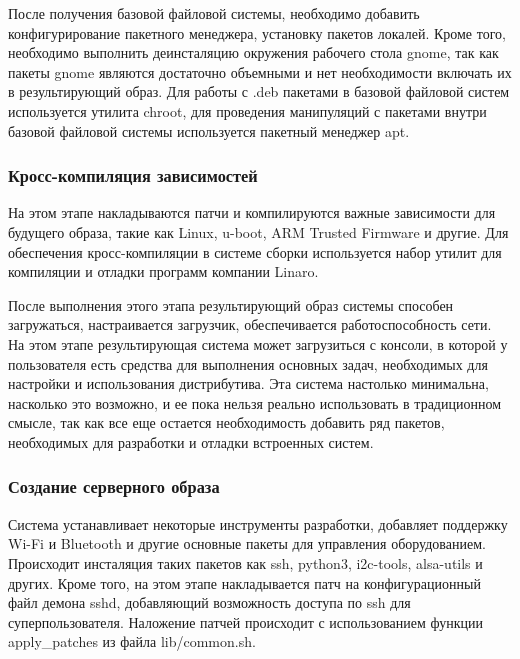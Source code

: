 После получения базовой файловой системы, необходимо добавить конфигурирование пакетного менеджера, установку пакетов локалей.
Кроме того, необходимо выполнить деинсталяцию окружения рабочего стола gnome, так как пакеты gnome являются достаточно объемными и нет необходимости включать их в результирующий образ.
Для работы с .deb пакетами в базовой файловой систем используется утилита chroot, для проведения манипуляций с пакетами внутри базовой файловой системы используется пакетный менеджер apt.



\subsubsection{Кросс-компиляция зависимостей}
На этом этапе накладываются патчи и компилируются важные зависимости для будущего образа, такие как Linux, u-boot, ARM Trusted Firmware и другие.
Для обеспечения кросс-компиляции в системе сборки используется набор утилит для компиляции и отладки программ компании Linaro.


После выполнения этого этапа результирующий образ системы способен загружаться, настраивается загрузчик, обеспечивается работоспособность сети.
На этом этапе результирующая система может загрузиться с консоли, в которой у пользователя есть средства для выполнения основных задач, необходимых для настройки и использования дистрибутива.
Эта система настолько минимальна, насколько это возможно, и ее пока нельзя реально использовать в традиционном смысле, так как все еще остается необходимость добавить ряд пакетов, необходимых для разработки и отладки встроенных систем.

\subsubsection {Создание серверного образа}
Система устанавливает некоторые инструменты разработки, добавляет поддержку Wi-Fi и Bluetooth и другие основные пакеты для управления оборудованием.
Происходит инсталяция таких пакетов как ssh, python3, i2c-tools, alsa-utils и других.
Кроме того, на этом этапе накладывается патч на конфигурационный файл демона sshd, добавляющий возможность доступа по ssh для суперпользователя.
Наложение патчей происходит с использованием функции apply\_patches из файла lib/common.sh.

\newpage

